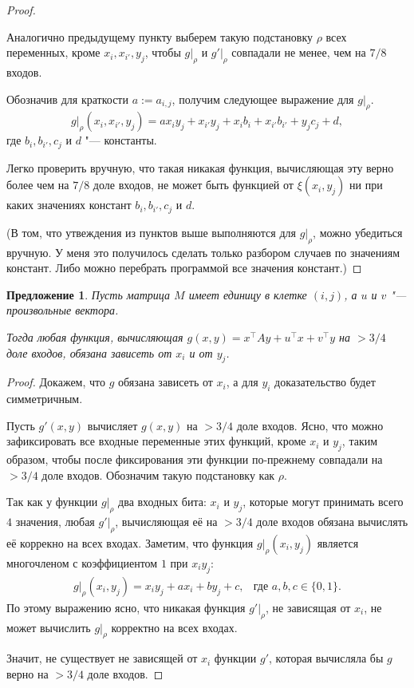 \documentclass[oneside, a4paper]{article}
\newtheorem{proposition}{Предложение}
\theoremstyle{definition}
\theoremstyle{remark}
\begin{document}
\begin{proof}
\begin{description}
Аналогично предыдущему пункту выберем такую подстановку $\rho$ всех переменных,
кроме $x_i, x_{i'}, y_j$, чтобы $g \rvert _ \rho$ и $g' \rvert _ \rho$ совпадали
не менее, чем на $7/8$ входов.

Обозначив для краткости $a := a_{i, j}$, получим следующее выражение для $g
\rvert _ \rho$.
\[
g \rvert _ \rho (x_i, x_{i'}, y_j) = a x_i y_j + x_{i'} y_j + x_i b_i + x_{i'} b_{i'} + y_j c_j + d,
\]
где $b_{i}, b_{i'}, c_j$ и $d$ "--- константы.

Легко проверить вручную, что такая никакая функция, вычисляющая эту верно более
чем на $7/8$ доле входов, не может быть функцией от $\xi(x_i, y_j)$ ни при каких
значениях констант $b_{i}, b_{i'}, c_j$ и $d$.
\end{description}

(В том, что утвеждения из пунктов выше выполняются для $g \rvert _ \rho$, можно
убедиться вручную. У меня это получилось сделать только разбором случаев по
значениям констант. Либо можно перебрать программой все значения констант.)
\end{proof}

\begin{proposition} \label{single_one}
Пусть матрица $M$ имеет единицу в клетке $(i, j)$, а $u$ и $v$ "--- произвольные
вектора.

Тогда любая функция, вычисляющая $g(x, y) = x^\top A y + u^\top x + v^\top y$ на
$> 3/4$ доле входов, обязана зависеть от $x_i$ и от $y_j$.
\end{proposition}
\begin{proof}
Докажем, что $g$ обязана зависеть от $x_i$, а для $y_i$ доказательство будет
симметричным.

Пусть $g'(x, y)$ вычисляет $g(x, y)$ на $> 3/4$ доле входов. Ясно, что можно
зафиксировать все входные переменные этих функций, кроме $x_i$ и $y_j$, таким
образом, чтобы после фиксирования эти функции по-прежнему совпадали на $> 3/4$
доле входов. Обозначим такую подстановку как $\rho$.

Так как у функции $g \rvert _ \rho$ два входных бита: $x_i$ и $y_j$, которые
могут принимать всего $4$ значения, любая $g' \rvert _ \rho$, вычисляющая
её на $> 3/4$ доле входов обязана вычислять её коррекно на всех входах. Заметим,
что функция $g \rvert _ \rho(x_i, y_j)$ является многочленом с коэффициентом $1$
при $x_i y_j$:
\[
\begin{aligned}
&g \rvert _ \rho (x_i, y_j) = x_i y_j + a x_i + b y_j + c,
&
\text{где $a, b, c \in \{0, 1\}$.}&
\end{aligned}
\]
По этому выражению ясно, что никакая функция $g' \rvert _ \rho$, не зависящая от
$x_i$, не может вычислить $g \rvert _ \rho$ корректно на всех входах.

Значит, не существует не зависящей от $x_i$ функции $g'$, которая вычисляла бы
$g$ верно на $> 3/4$ доле входов.
\end{proof}
\end{document}
